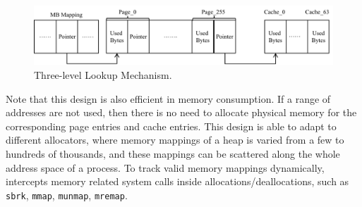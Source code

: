 \begin{figure}[!ht]
\centering
\includegraphics[width=5.5in]{figures/lookup}
\caption{Three-level Lookup Mechanism.\label{fig:lookup}}
\end{figure}

Note that this design is also efficient in memory consumption. If a range of addresses are not used, then there is no need to allocate physical memory for the corresponding page entries and cache entries. This design is able to adapt to different allocators, where memory mappings of a heap is varied from a few to hundreds of thousands, and these mappings can be scattered along the whole address space of a process. To track valid memory mappings dynamically, \MP{} intercepts memory related system calls inside allocations/deallocations, such as \texttt{sbrk}, \texttt{mmap}, \texttt{munmap}, \texttt{mremap}. 